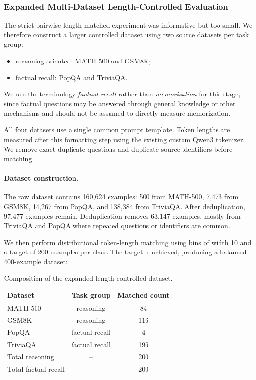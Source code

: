 \documentclass[11pt]{article}
\begin{document}

\subsubsection{Expanded Multi-Dataset Length-Controlled Evaluation}

The strict pairwise length-matched experiment was informative but too
small. We therefore construct a larger controlled dataset using two
source datasets per task group:

\begin{itemize}
    \item reasoning-oriented: MATH-500 and GSM8K;
    \item factual recall: PopQA and TriviaQA.
\end{itemize}

We use the terminology \textit{factual recall} rather than
\textit{memorization} for this stage, since factual questions may be
answered through general knowledge or other mechanisms and should not
be assumed to directly measure memorization.

All four datasets use a single common prompt template. Token lengths
are measured after this formatting step using the existing custom
Qwen3 tokenizer. We remove exact duplicate questions and duplicate
source identifiers before matching.

\paragraph{Dataset construction.}

The raw dataset contains 160,624 examples: 500 from MATH-500, 7,473
from GSM8K, 14,267 from PopQA, and 138,384 from TriviaQA. After
deduplication, 97,477 examples remain. Deduplication removes 63,147
examples, mostly from TriviaQA and PopQA where repeated questions or
identifiers are common.

We then perform distributional token-length matching using bins of
width 10 and a target of 200 examples per class. The target is
achieved, producing a balanced 400-example dataset:

\begin{table}[H]
    \centering
    \begin{tabular}{lcc}
        \toprule
        Dataset & Task group & Matched count \\
        \midrule
        MATH-500 & reasoning & 84 \\
        GSM8K & reasoning & 116 \\
        PopQA & factual recall & 4 \\
        TriviaQA & factual recall & 196 \\
        \midrule
        Total reasoning & -- & 200 \\
        Total factual recall & -- & 200 \\
        \bottomrule
    \end{tabular}
    \caption{Composition of the expanded length-controlled dataset.}
    \label{tab:expanded-dataset-composition}
\end{table}
\end{document}
